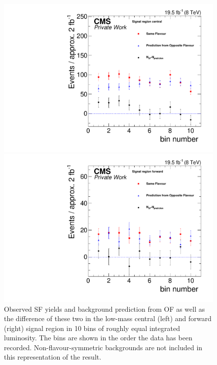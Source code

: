 \begin{figure}[tb]
\centering
\begin{minipage}[t]{0.49\textwidth}
  \includegraphics[width=\textwidth]{plots/results/YieldvsLumi_Bins_SignalCentral_Mll_edgeMassFull2012.pdf}
\end{minipage}
\begin{minipage}[t]{0.49\textwidth}
\includegraphics[width=\textwidth]{plots/results/YieldvsLumi_Bins_SignalForward_Mll_edgeMassFull2012.pdf}
\end{minipage}

\caption{Observed SF yields and background prediction from OF as well as the difference of these two in the low-mass central (left) and forward (right) signal region in 10 bins of roughly equal integrated luminosity. The bins are shown in the order the data has been recorded. Non-flavour-symmetric backgrounds are not included in this representation of the result.}
\label{fig:timeDependece}
\end{figure}

